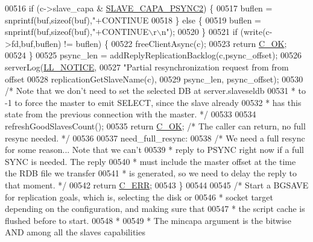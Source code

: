 \begin{DoxyCode}
{{{{{{{{{{{{{{{{{{{{{{{{{{00516     \textcolor{keywordflow}{if} (c->slave\_capa & \hyperlink{server_8h_a7ae8ce840619af1c0922648a45816afe}{SLAVE\_CAPA\_PSYNC2}) \{
00517         buflen = snprintf(buf,\textcolor{keyword}{sizeof}(buf),\textcolor{stringliteral}{"+CONTINUE %
00518     \} \textcolor{keywordflow}{else} \{
00519         buflen = snprintf(buf,\textcolor{keyword}{sizeof}(buf),\textcolor{stringliteral}{"+CONTINUE\(\backslash\)r\(\backslash\)n"});
00520     \}
00521     \textcolor{keywordflow}{if} (write(c->fd,buf,buflen) != buflen) \{
00522         freeClientAsync(c);
00523         \textcolor{keywordflow}{return} \hyperlink{server_8h_a303769ef1065076e68731584e758d3e1}{C\_OK};
00524     \}
00525     psync\_len = addReplyReplicationBacklog(c,psync\_offset);
00526     serverLog(\hyperlink{server_8h_a8c54c191e436c7dd3012167212692401}{LL\_NOTICE},
00527         \textcolor{stringliteral}{"Partial resynchronization request from %
       from offset %
00528             replicationGetSlaveName(c),
00529             psync\_len, psync\_offset);
00530     \textcolor{comment}{/* Note that we don't need to set the selected DB at server.slaveseldb}
00531 \textcolor{comment}{     * to -1 to force the master to emit SELECT, since the slave already}
00532 \textcolor{comment}{     * has this state from the previous connection with the master. */}
00533 
00534     refreshGoodSlavesCount();
00535     \textcolor{keywordflow}{return} \hyperlink{server_8h_a303769ef1065076e68731584e758d3e1}{C\_OK}; \textcolor{comment}{/* The caller can return, no full resync needed. */}
00536 
00537 need\_full\_resync:
00538     \textcolor{comment}{/* We need a full resync for some reason... Note that we can't}
00539 \textcolor{comment}{     * reply to PSYNC right now if a full SYNC is needed. The reply}
00540 \textcolor{comment}{     * must include the master offset at the time the RDB file we transfer}
00541 \textcolor{comment}{     * is generated, so we need to delay the reply to that moment. */}
00542     \textcolor{keywordflow}{return} \hyperlink{server_8h_af98ac28d5f4d23d7ed5985188e6fb7d1}{C\_ERR};
00543 \}
00544 
00545 \textcolor{comment}{/* Start a BGSAVE for replication goals, which is, selecting the disk or}
00546 \textcolor{comment}{ * socket target depending on the configuration, and making sure that}
00547 \textcolor{comment}{ * the script cache is flushed before to start.}
00548 \textcolor{comment}{ *}
00549 \textcolor{comment}{ * The mincapa argument is the bitwise AND among all the slaves capabilities}
}}}}}}}}}}}}}}}}}}}}}}}}}}}}
\end{DoxyCode}
